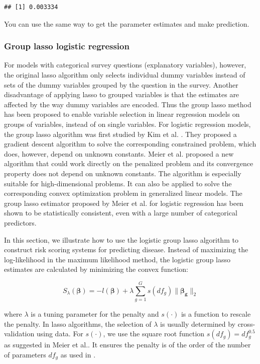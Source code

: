 \documentclass[12pt,]{krantz}
\begin{document}
\begin{verbatim}
## [1] 0.003334
\end{verbatim}

You can use the same way to get the parameter estimates and make prediction.

\hypertarget{group-lasso-logistic-regression}{%
\subsubsection{Group lasso logistic regression}\label{group-lasso-logistic-regression}}

For models with categorical survey questions (explanatory variables), however, the original lasso algorithm only selects individual dummy variables instead of sets of the dummy variables grouped by the question in the survey. Another disadvantage of applying lasso to grouped variables is that the estimates are affected by the way dummy variables are encoded. Thus the group lasso \citep{Yuan2007} method has been proposed to enable variable selection in linear regression models on groups of variables, instead of on single variables. For logistic regression models, the group lasso algorithm was first studied by Kim et al. \citep{Kim2006}. They proposed a gradient descent algorithm to solve the corresponding constrained problem, which does, however, depend on unknown constants. Meier et al. \citep{Meier2008} proposed a new algorithm that could work directly on the penalized problem and its convergence property does not depend on unknown constants. The algorithm is especially suitable for high-dimensional problems. It can also be applied to solve the corresponding convex optimization problem in generalized linear models. The group lasso estimator proposed by Meier et al. \citep{Meier2008} for logistic regression has been shown to be statistically consistent, even with a large number of categorical predictors.

In this section, we illustrate how to use the logistic group lasso algorithm to construct risk scoring systems for predicting disease. Instead of maximizing the log-likelihood in the maximum likelihood method, the logistic group lasso estimates are calculated by minimizing the convex function:

\[
S_{\lambda}(\mathbf{\beta})=-l(\mathbf{\beta})+\lambda\sum_{g=1}^{G}s(df_{g})\parallel\mathbf{\beta_{g}}\parallel_{2}
\]

where \(\lambda\) is a tuning parameter for the penalty and \(s(\cdot)\) is a function to rescale the penalty. In lasso algorithms, the selection of \(\lambda\) is usually determined by cross-validation using data. For \(s(\cdot)\), we use the square root function \(s(df_g)=df_g^{0.5}\) as suggested in Meier et al.\citep{Meier2008}. It ensures the penalty is of the order of the number of parameters \(df_g\) as used in \citep{Yuan2007}.
\end{document}
